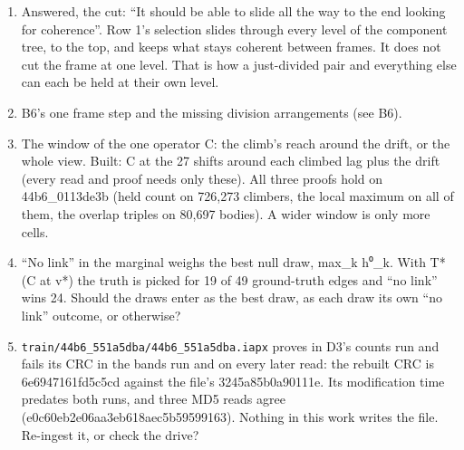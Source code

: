 \begin{enumerate}
\item Answered, the cut: “It should be able to slide all the way to the end looking for coherence”. Row 1's selection slides through every level of the component tree, to the top, and keeps what stays coherent between frames. It does not cut the frame at one level. That is how a just-divided pair and everything else can each be held at their own level.
\item B6's one frame step and the missing division arrangements (see B6).
\item The window of the one operator C: the climb's reach around the drift, or the whole view. Built: C at the 27 shifts around each climbed lag plus the drift (every read and proof needs only these). All three proofs hold on 44b6\_\allowbreak{}0113de3b (held count on 726,273 climbers, the local maximum on all of them, the overlap triples on 80,697 bodies). A wider window is only more cells.
\item “No link” in the marginal weighs the best null draw, max\_\allowbreak{}k h⁰\_\allowbreak{}k. With T* (C at v*) the truth is picked for 19 of 49 ground-truth edges and “no link” wins 24. Should the draws enter as the best draw, as each draw its own “no link” outcome, or otherwise?
\item \texttt{train/\allowbreak{}44b6\_\allowbreak{}551a5dba/\allowbreak{}44b6\_\allowbreak{}551a5dba.\allowbreak{}iapx} proves in D3's counts run and fails its CRC in the bands run and on every later read: the rebuilt CRC is 6e6947161fd5c5cd against the file's 3245a85b0a90111e. Its modification time predates both runs, and three MD5 reads agree (e0c60eb2e06aa3eb618aec5b59599163). Nothing in this work writes the file. Re-ingest it, or check the drive?

\end{enumerate}
